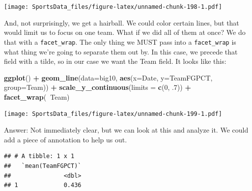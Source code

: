 \documentclass[
]{book}
\newenvironment{Shaded}{\begin{snugshade}}{\end{snugshade}}
\newcommand{\DataTypeTok}[1]{\textcolor[rgb]{0.13,0.29,0.53}{#1}}
\newcommand{\DecValTok}[1]{\textcolor[rgb]{0.00,0.00,0.81}{#1}}
\newcommand{\FloatTok}[1]{\textcolor[rgb]{0.00,0.00,0.81}{#1}}
\newcommand{\KeywordTok}[1]{\textcolor[rgb]{0.13,0.29,0.53}{\textbf{#1}}}
\newcommand{\NormalTok}[1]{#1}
\newcommand{\OperatorTok}[1]{\textcolor[rgb]{0.81,0.36,0.00}{\textbf{#1}}}
\newcommand{\StringTok}[1]{\textcolor[rgb]{0.31,0.60,0.02}{#1}}
\begin{document}
\texttt{[image: SportsData\_files/figure-latex/unnamed-chunk-198-1.pdf]}

And, not surprisingly, we get a hairball. We could color certain lines, but that would limit us to focus on one team. What if we did all of them at once? We do that with a \texttt{facet\_wrap}. The only thing we MUST pass into a \texttt{facet\_wrap} is what thing we're going to separate them out by. In this case, we precede that field with a tilde, so in our case we want the Team field. It looks like this:

\begin{Shaded}
\begin{Highlighting}[]
\KeywordTok{ggplot}\NormalTok{() }\OperatorTok{+}\StringTok{ }
\StringTok{  }\KeywordTok{geom_line}\NormalTok{(}\DataTypeTok{data=}\NormalTok{big10, }\KeywordTok{aes}\NormalTok{(}\DataTypeTok{x=}\NormalTok{Date, }\DataTypeTok{y=}\NormalTok{TeamFGPCT, }\DataTypeTok{group=}\NormalTok{Team)) }\OperatorTok{+}\StringTok{ }
\StringTok{  }\KeywordTok{scale_y_continuous}\NormalTok{(}\DataTypeTok{limits =} \KeywordTok{c}\NormalTok{(}\DecValTok{0}\NormalTok{, }\FloatTok{.7}\NormalTok{)) }\OperatorTok{+}\StringTok{ }
\StringTok{  }\KeywordTok{facet_wrap}\NormalTok{(}\OperatorTok{~}\NormalTok{Team)}
\end{Highlighting}
\end{Shaded}

\texttt{[image: SportsData\_files/figure-latex/unnamed-chunk-199-1.pdf]}

Answer: Not immediately clear, but we can look at this and analyze it. We could add a piece of annotation to help us out.

\begin{Shaded}
\end{Shaded}

\begin{verbatim}
## # A tibble: 1 x 1
##   `mean(TeamFGPCT)`
##               <dbl>
## 1             0.436
\end{verbatim}
\end{document}
